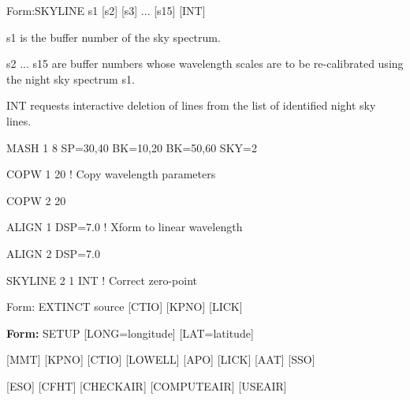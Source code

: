 {\newpage\clearpage
{}%
\begin{command}
  \item[Form:SKYLINE s1 {[s2]} {[s3]} ... {[s15]} {[INT]}\hfill]{}
  \item[s1]{is the buffer number of the sky spectrum.}
  \item[s2 ... s15]{are buffer numbers whose wavelength
       scales are to be re-calibrated using the night sky spectrum s1.}
  \item[INT]{requests interactive deletion of lines
       from the list of identified night sky lines.}
\end{command}%
\lthtmlfigureZ
\lthtmlcheckvsize\clearpage}

{\newpage\clearpage
{}%
\begin{example}
  \item[MASH 1 8 SP=30,40 BK=10,20 BK=50,60 SKY=2\hfill]{}
  \item[COPW 1 20\hfill]{! Copy wavelength parameters}
  \item[COPW 2 20\hfill]{}
  \item[ALIGN 1 DSP=7.0\hfill]{! Xform to linear wavelength}
  \item[ALIGN 2 DSP=7.0\hfill]{}
  \item[SKYLINE 2 1 INT\hfill]{! Correct zero-point}
\end{example}%
\lthtmlfigureZ
\lthtmlcheckvsize\clearpage}

{\newpage\clearpage
{}%
\begin{command}
  \item[Form: EXTINCT source {[CTIO]} {[KPNO]} {[LICK]}\hfill]{}
\end{command}%
\lthtmlfigureZ
\lthtmlcheckvsize\clearpage}

{\newpage\clearpage
{}%
\begin{command}
  \item[\textbf{Form: } SETUP {[LONG=longitude]} {[LAT=latitude]}\hfill]{}
  \item{{[MMT]} {[KPNO]} {[CTIO]} {[LOWELL]} {[APO]} {[LICK]} {[AAT]} {[SSO]}}
  \item{{[ESO]} {[CFHT]} {[CHECKAIR]} {[COMPUTEAIR]} {[USEAIR]}} 
\end{command}%
\lthtmlfigureZ
\lthtmlcheckvsize\clearpage}

